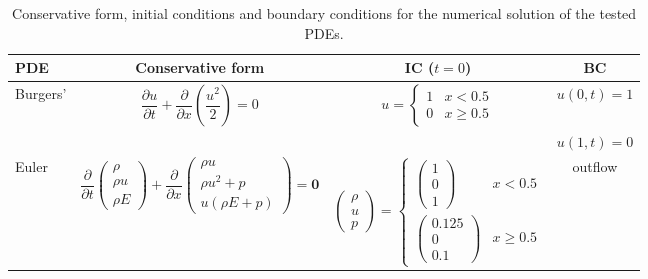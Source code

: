 \documentclass{article} %
\theoremstyle{plain}
\begin{document}
\begin{table}[h]
\centering
\renewcommand{\arraystretch}{1.1}
\small
\caption{Conservative form, initial conditions and boundary conditions for the numerical solution of the tested PDEs.}
\begin{tabular}{lccc}
\hline
\textbf{PDE} & \textbf{Conservative form} & \textbf{IC ($t=0$)} & \textbf{BC} \\
\hline
Burgers' &
$\dfrac{\partial u}{\partial t} + \dfrac{\partial}{\partial x}\left(\dfrac{u^2}{2}\right) = 0$
&
$u = \begin{cases}
1 & x<0.5 \\
0 & x\ge0.5
\end{cases}$
& $u(0,t)=1$ \\
& & & $u(1,t)= 0$ \\
\hline
Euler &
$\dfrac{\partial}{\partial t}
\begin{pmatrix} \rho \\ \rho u \\ \rho E \end{pmatrix}
+
\dfrac{\partial}{\partial x}
\begin{pmatrix} \rho u \\ \rho u^2 + p \\ u(\rho E + p) \end{pmatrix}
= \mathbf{0}$
&
$\begin{pmatrix} \rho \\ u \\ p \end{pmatrix} = \begin{cases}
\begin{pmatrix} 1 \\  0\\ 1 \end{pmatrix}& x<0.5 \\
\begin{pmatrix} 0.125\\ 0 \\ 0.1 \end{pmatrix} & x\ge0.5
\end{cases}$
& outflow \\
\hline
\end{tabular}
\label{tab:pde_ic_bc_summary}
\end{table}
\end{document}
